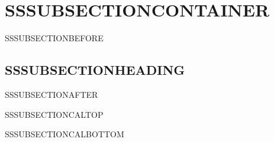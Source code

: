 \documentclass{abntexto-ufc}
\begin{document}
\textual

\section{SSSUBSECTIONCONTAINER}
SSSUBSECTIONBEFORE

\subsection{SSSUBSECTIONHEADING}
SSSUBSECTIONAFTER

\vspace{4\baselineskip}
{\onehalfsp
\noindent SSSUBSECTIONCALTOP\par
\vspace{\baselineskip}
\noindent SSSUBSECTIONCALBOTTOM\par
}
\end{document}
